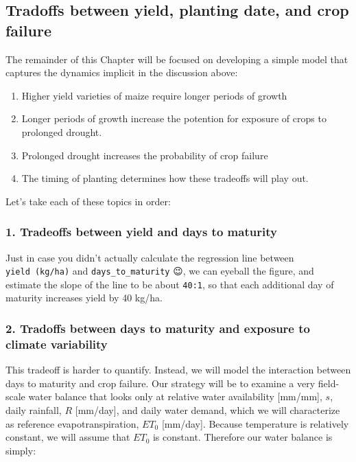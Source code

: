 \documentclass[11pt]{article}
\providecommand{\tightlist}{%
      \setlength{\itemsep}{0pt}\setlength{\parskip}{0pt}}
\begin{document}
\hypertarget{tradoffs-between-yield-planting-date-and-crop-failure}{%
\subsection{Tradoffs between yield, planting date, and crop
failure}\label{tradoffs-between-yield-planting-date-and-crop-failure}}

The remainder of this Chapter will be focused on developing a simple
model that captures the dynamics implicit in the discussion above:

\begin{enumerate}
\def\labelenumi{\arabic{enumi}.}
\tightlist
\item
  Higher yield varieties of maize require longer periods of growth
\item
  Longer periods of growth increase the potention for exposure of crops
  to prolonged drought.
\item
  Prolonged drought increases the probability of crop failure
\item
  The timing of planting determines how these tradeoffs will play out.
\end{enumerate}

Let's take each of these topics in order:

\hypertarget{tradeoffs-between-yield-and-days-to-maturity}{%
\subsubsection{1. Tradeoffs between yield and days to
maturity}\label{tradeoffs-between-yield-and-days-to-maturity}}

Just in case you didn't actually calculate the regression line between
\texttt{yield\ (kg/ha)} and \texttt{days\_to\_maturity} 😉, we can
eyeball the figure, and estimate the slope of the line to be about
\texttt{40:1}, so that each additional day of maturity increases yield
by 40 kg/ha.

\hypertarget{tradoffs-between-days-to-maturity-and-exposure-to-climate-variability}{%
\subsubsection{2. Tradoffs between days to maturity and exposure to
climate
variability}\label{tradoffs-between-days-to-maturity-and-exposure-to-climate-variability}}

This tradeoff is harder to quantify. Instead, we will model the
interaction between days to maturity and crop failure. Our strategy will
be to examine a very field-scale water balance that looks only at
relative water availability {[}mm/mm{]}, \(s\), daily rainfall, \(R\)
{[}mm/day{]}, and daily water demand, which we will characterize as
reference evapotranspiration, \(ET_0\) {[}mm/day{]}. Because temperature
is relatively constant, we will assume that \(ET_0\) is constant.
Therefore our water balance is simply:
\end{document}
